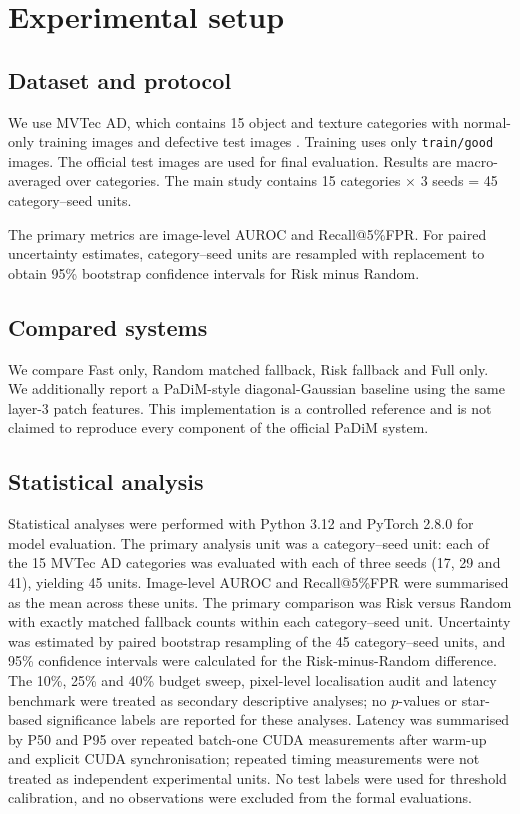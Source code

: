 \documentclass[preprint,12pt]{elsarticle}
\begin{document}
\section{Experimental setup}

\subsection{Dataset and protocol}

We use MVTec AD, which contains 15 object and texture categories with normal-only training images and defective test images \cite{mvtec}. Training uses only \texttt{train/good} images. The official test images are used for final evaluation. Results are macro-averaged over categories. The main study contains 15 categories $\times$ 3 seeds = 45 category--seed units.

The primary metrics are image-level AUROC and Recall@5\%FPR. For paired uncertainty estimates, category--seed units are resampled with replacement to obtain 95\% bootstrap confidence intervals for Risk minus Random.

\subsection{Compared systems}

We compare Fast only, Random matched fallback, Risk fallback and Full only. We additionally report a PaDiM-style diagonal-Gaussian baseline using the same layer-3 patch features. This implementation is a controlled reference and is not claimed to reproduce every component of the official PaDiM system.

\subsection{Statistical analysis}

Statistical analyses were performed with Python 3.12 and PyTorch 2.8.0 for model evaluation. The primary analysis unit was a category--seed unit: each of the 15 MVTec AD categories was evaluated with each of three seeds (17, 29 and 41), yielding 45 units. Image-level AUROC and Recall@5\%FPR were summarised as the mean across these units. The primary comparison was Risk versus Random with exactly matched fallback counts within each category--seed unit. Uncertainty was estimated by paired bootstrap resampling of the 45 category--seed units, and 95\% confidence intervals were calculated for the Risk-minus-Random difference. The 10\%, 25\% and 40\% budget sweep, pixel-level localisation audit and latency benchmark were treated as secondary descriptive analyses; no $p$-values or star-based significance labels are reported for these analyses. Latency was summarised by P50 and P95 over repeated batch-one CUDA measurements after warm-up and explicit CUDA synchronisation; repeated timing measurements were not treated as independent experimental units. No test labels were used for threshold calibration, and no observations were excluded from the formal evaluations.
\end{document}
